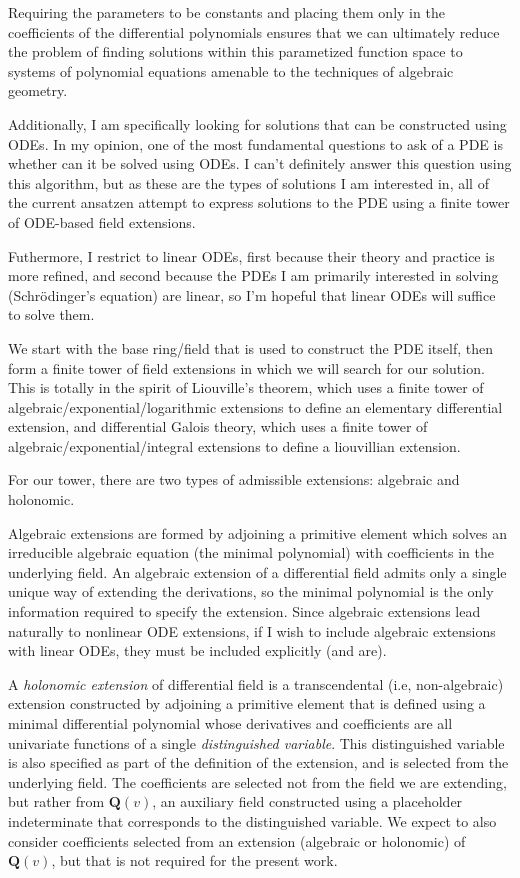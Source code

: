 \documentclass{article}
\begin{document}
Requiring the parameters to be constants and placing them only in the coefficients
of the differential polynomials ensures that we can ultimately reduce the problem
of finding solutions within this parametized function space to systems
of polynomial equations
amenable to the techniques of algebraic geometry.

Additionally, I am specifically looking for solutions that can be constructed using ODEs.
In my opinion, one of the most fundamental questions to ask of a PDE is whether can it
be solved using ODEs.  I can't definitely answer this question using
this algorithm, but as these are the types of solutions I am interested in,
all of the current ansatzen attempt to express solutions to the PDE using
a finite tower of ODE-based field extensions.

Futhermore, I restrict to linear ODEs, first because their theory
and practice is more refined,
and second because the PDEs I am primarily interested in solving (Schr\"odinger's equation)
are linear, so I'm hopeful that linear ODEs will suffice to solve them.

We start with the base ring/field that is used to construct the PDE itself, then form
a finite tower of field extensions in which we will search for our solution.  This
is totally in the spirit of Liouville's theorem, which uses a finite tower
of algebraic/exponential/logarithmic extensions to define an elementary differential
extension, and differential Galois theory, which uses a finite tower of
algebraic/exponential/integral extensions to define a liouvillian extension.

For our tower, there are two types of admissible extensions: algebraic and holonomic.

Algebraic extensions are formed by adjoining a primitive element which solves
an irreducible algebraic equation (the minimal polynomial) with coefficients
in the underlying field.  An algebraic extension of a differential field
admits only a single unique way of extending the derivations, so the minimal
polynomial is the only information required to specify the extension.
Since algebraic extensions lead naturally
to nonlinear ODE extensions, if I wish to include algebraic extensions with
linear ODEs, they must be included explicitly (and are).

A {\it holonomic extension} of differential field is a transcendental (i.e, non-algebraic)
extension constructed by adjoining a primitive element that is defined using a minimal differential polynomial
whose derivatives and coefficients are all univariate functions of a single {\it distinguished variable}.
This distinguished variable
is also specified as part of the definition of the extension, and is selected from the
underlying field.  The coefficients are
selected not from the field we are extending, but rather from ${\mathbf Q}(v)$, an auxiliary field
constructed using a placeholder indeterminate that corresponds to the distinguished variable.
We expect to also consider coefficients selected from an extension (algebraic or holonomic)
of ${\mathbf Q}(v)$, but that is not required for the present work.
\end{document}
